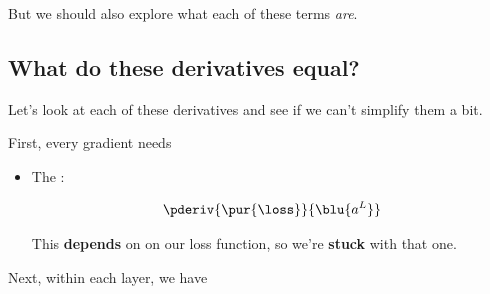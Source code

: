         But we should also explore what each of these terms \textit{are}.
        
    \secdiv
    
    \subsection{What do these derivatives equal?}
    
        Let's look at each of these derivatives and see if we can't simplify them a bit.
        
        First, every gradient needs
        
        \begin{itemize}
            \item The :
            
                \begin{equation}
                    \pderiv {\pur{\loss}} {\blu{a^L}}
                \end{equation}
                
                This \textbf{depends} on on our loss function, so we're \textbf{stuck} with that one.
            
        \end{itemize}
            
        Next, within each layer, we have
        
